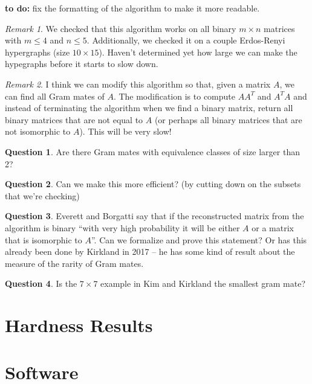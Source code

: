 \documentclass[11pt]{article}
\theoremstyle{definition}
\newtheorem{question}{Question}
\theoremstyle{remark}
\newtheorem{remark}{Remark}
\begin{document}
{\bf to do:} fix the formatting of the algorithm to make it more readable. 
	
\begin{remark}
We checked that this algorithm works on all binary $m \times n$ matrices with $m \leq 4$ and $n \leq 5$. Additionally, we checked it on a couple Erdos-Renyi hypergraphs (size $10 \times 15$). Haven't determined yet how large we can make the hypegraphs before it starts to slow down. 
\end{remark}
	
\begin{remark}
I think we can modify this algorithm so that, given a matrix $A$, we can find all Gram mates of $A$. The modification is to compute $AA^{T}$ and $A^{T}A$ and instead of terminating the algorithm when we find a binary matrix, return all binary matrices that are not equal to $A$ (or perhaps all binary matrices that are not isomorphic to $A$). This will be very slow!
\end{remark}

\begin{question}
Are there Gram mates with equivalence classes of size larger than 2?
\end{question}

\begin{question}
Can we make this more efficient? (by cutting down on the subsets that we're checking)
\end{question}

\begin{question}
Everett and Borgatti say that if the reconstructed matrix from the algorithm is binary ``with very high probability it will be either $A$ or a matrix that is isomorphic to $A$''. Can we formalize and prove this statement? Or has this already been done by Kirkland in 2017 -- he has some kind of result about the measure of the rarity of Gram mates. 
\end{question}

\begin{question}
Is the $7 \times 7$ example in Kim and Kirkland \cite{Kirkland} the smallest gram mate?
\end{question}

\section{Hardness Results}


\section{Software}




\end{document}
